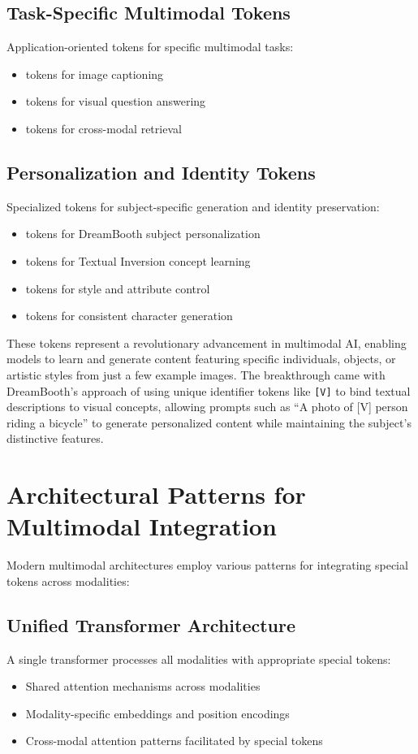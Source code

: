 \subsection{Task-Specific Multimodal Tokens}
Application-oriented tokens for specific multimodal tasks:
\begin{itemize}
\item {} tokens for image captioning
\item {} tokens for visual question answering
\item {} tokens for cross-modal retrieval
\end{itemize}

\subsection{Personalization and Identity Tokens}
Specialized tokens for subject-specific generation and identity preservation:
\begin{itemize}
\item {} tokens for DreamBooth subject personalization
\item {} tokens for Textual Inversion concept learning
\item {} tokens for style and attribute control
\item {} tokens for consistent character generation
\end{itemize}

These tokens represent a revolutionary advancement in multimodal AI, enabling models to learn and generate content featuring specific individuals, objects, or artistic styles from just a few example images. The breakthrough came with DreamBooth's approach of using unique identifier tokens like \texttt{[V]} to bind textual descriptions to visual concepts, allowing prompts such as ``A photo of [V] person riding a bicycle'' to generate personalized content while maintaining the subject's distinctive features.

\section{Architectural Patterns for Multimodal Integration}

Modern multimodal architectures employ various patterns for integrating special tokens across modalities:

\subsection{Unified Transformer Architecture}
A single transformer processes all modalities with appropriate special tokens:
\begin{itemize}
\item Shared attention mechanisms across modalities
\item Modality-specific embeddings and position encodings
\item Cross-modal attention patterns facilitated by special tokens
\end{itemize}

